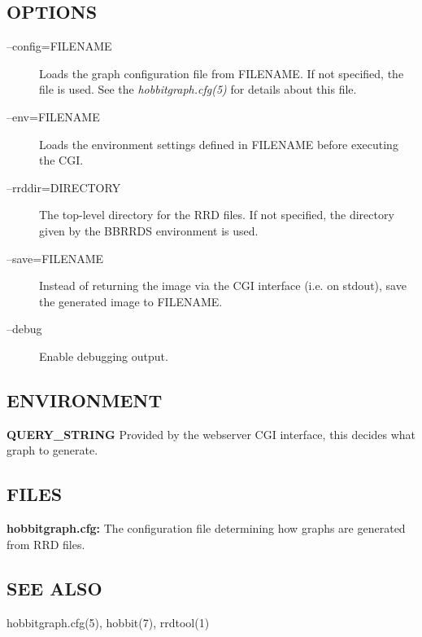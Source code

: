 \subsection{OPTIONS}
\begin{description}
\item[--config=FILENAME] Loads the graph configuration file from FILENAME. If not specified, the file  is used. See the \emph{hobbitgraph.cfg(5)}
 for details about this file. 

 

\item[--env=FILENAME] Loads the environment settings defined in FILENAME before executing the CGI. 

 

\item[--rrddir=DIRECTORY] The top-level directory for the RRD files. If not specified, the directory given by the BBRRDS environment is used. 

 

\item[--save=FILENAME] Instead of returning the image via the CGI interface (i.e. on stdout), save the generated image to FILENAME. 

 

\item[--debug] Enable debugging output. 

 


\end{description}
\subsection{ENVIRONMENT}


 \textbf{QUERY\_STRING}
 Provided by the webserver CGI interface, this decides what graph to generate. 


 
\subsection{FILES}


 \textbf{hobbitgraph.cfg:}
 The configuration file determining how graphs are generated from RRD files. 


 
\subsection{SEE ALSO}
hobbitgraph.cfg(5), hobbit(7), rrdtool(1) 


